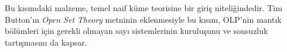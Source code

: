 


\begin{editorial}
  Bu kısımdaki malzeme, temel naif küme teorisine bir giriş niteliğindedir.
  Tim Button'ın \emph{Open Set Theory} metninin eklenmesiyle bu kısım, OLP'nin
  mantık bölümleri için gerekli olmayan sayı sistemlerinin kuruluşunu ve
  sonsuzluk tartışmasını da kapsar.
\end{editorial}







\OLEndPartHook
